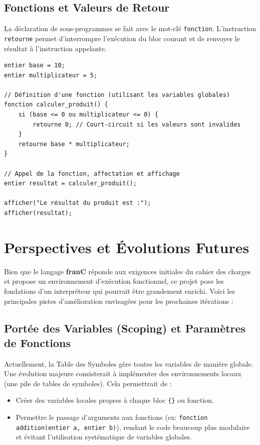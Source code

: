 \documentclass[pfe ,titlesmallcaps]{isi_report}
\begin{document}
\section{Fonctions et Valeurs de Retour}
La déclaration de sous-programmes se fait avec le mot-clé \texttt{fonction}. L'instruction \texttt{retourne} permet d'interrompre l'exécution du bloc courant et de renvoyer le résultat à l'instruction appelante.

\begin{verbatim}
entier base = 10;
entier multiplicateur = 5;

// Définition d'une fonction (utilisant les variables globales)
fonction calculer_produit() {
    si (base <= 0 ou multiplicateur <= 0) {
        retourne 0; // Court-circuit si les valeurs sont invalides
    }
    retourne base * multiplicateur;
}

// Appel de la fonction, affectation et affichage
entier resultat = calculer_produit();

afficher("Le résultat du produit est :");
afficher(resultat);
\end{verbatim}

\chapter{Perspectives et Évolutions Futures}

Bien que le langage \textbf{franC} réponde aux exigences initiales du cahier des charges et propose un environnement d'exécution fonctionnel, ce projet pose les fondations d'un interpréteur qui pourrait être grandement enrichi. Voici les principales pistes d'amélioration envisagées pour les prochaines itérations :

\section{Portée des Variables (Scoping) et Paramètres de Fonctions}
Actuellement, la Table des Symboles gère toutes les variables de manière globale. Une évolution majeure consisterait à implémenter des environnements locaux (une pile de tables de symboles). Cela permettrait de :
\begin{itemize}
	\item Créer des variables locales propres à chaque bloc \texttt{\{\}} ou fonction.
	\item Permettre le passage d'arguments aux fonctions (ex: \texttt{fonction addition(entier a, entier b)}), rendant le code beaucoup plus modulaire et évitant l'utilisation systématique de variables globales.
\end{itemize}
\end{document}
